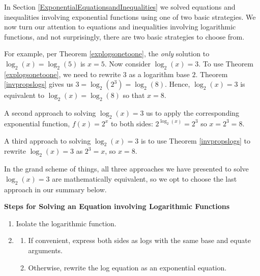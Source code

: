 \documentclass{ximera}
\begin{document}
	\author{Stitz-Zeager}




\setcounter{footnote}{0}

\label{LogarithmicEquationsandInequalities}

In Section \ref{ExponentialEquationsandInequalities} we solved equations and inequalities involving exponential functions using one of two basic strategies.  We now turn our attention to equations and inequalities involving logarithmic functions, and not surprisingly, there are two basic strategies to choose from.  



For example, per Theorem \ref{explogsonetoone}, the \textit{only} solution to $\log_{2}(x) = \log_{2}(5)$ is $x=5$.   Now consider $\log_{2}(x) = 3$.  To use Theorem \ref{explogsonetoone}, we need to rewrite $3$ as a logarithm base $2$.   Theorem \ref{invpropslogs} gives us $3 = \log_{2}\left(2^{3}\right) = \log_{2}(8)$.  Hence, $\log_{2}(x) = 3$ is equivalent to  $\log_{2}(x) =  \log_{2}(8)$ so that $x = 8$. 

A second approach to solving  $\log_{2}(x) = 3$ us to apply the corresponding exponential function, $f(x) = 2^x$ to both sides:  $2^{\log_{2}(x)} = 2^{3}$ so $x = 2^3 = 8$.

A third approach to solving  $\log_{2}(x) = 3$ is to use  Theorem \ref{invpropslogs} to rewrite $\log_{2}(x) = 3$ as $2^{3} = x$, so  $x=8$.   

In the grand scheme of things, all three approaches we have presented to solve $\log_{2}(x) = 3$ are mathematically equivalent, so we opt to choose the last approach in our summary below.


\centerline{\textbf{Steps for Solving an Equation involving Logarithmic Functions}}  

\begin{enumerate}

\item  Isolate the logarithmic function.

\item  \begin{enumerate}

\item  If convenient, express both sides as logs with the same base and equate arguments.

\item  Otherwise, rewrite the log equation as an exponential equation.


\end{enumerate}

\end{enumerate}
\end{document}
